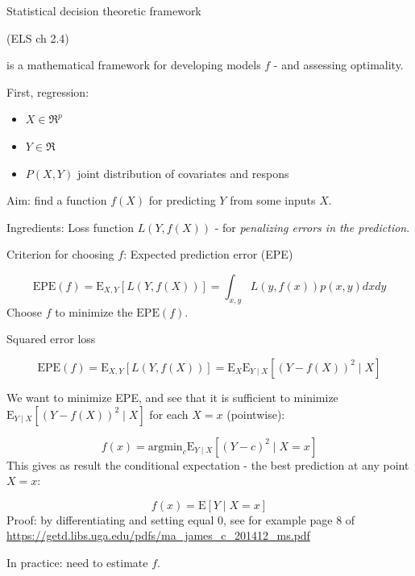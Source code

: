 \documentclass[
  ignorenonframetext,
]{beamer}
\providecommand{\tightlist}{%
  \setlength{\itemsep}{0pt}\setlength{\parskip}{0pt}}
\begin{document}
\begin{frame}{Statistical decision theoretic framework}
\protect\hypertarget{statistical-decision-theoretic-framework}{}

(ELS ch 2.4)

is a mathematical framework for developing models \(f\) - and assessing
optimality.

First, regression:

\begin{itemize}
\tightlist
\item
  \(X \in \Re^p\)
\item
  \(Y \in \Re\)
\item
  \(P(X,Y)\) joint distribution of covariates and respons
\end{itemize}

Aim: find a function \(f(X)\) for predicting \(Y\) from some inputs
\(X\).

Ingredients: Loss function \(L(Y,f(X))\) - for \emph{penalizing errors
in the prediction}.

Criterion for choosing \(f\): Expected prediction error (EPE)

\end{frame}

\begin{frame}

\[ \text{EPE}(f)=\text{E}_{X,Y}[L(Y,f(X))]=\int_{x,y}L(y,f(x))p(x,y)dxdy\]
Choose \(f\) to minimize the \(\text{EPE}(f)\).

\end{frame}

\begin{frame}

\begin{block}{Squared error loss}

\[ \text{EPE}(f)=\text{E}_{X,Y}[L(Y,f(X))]=\text{E}_{X}\text{E}_{Y \mid X}[(Y-f(X))^2\mid X]\]

We want to minimize EPE, and see that it is sufficient to minimize
\(\text{E}_{Y\mid X}[(Y-f(X))^2\mid X]\) for each \(X=x\) (pointwise):

\[ f(x)=\text{argmin}_c \text{E}_{Y \mid X}[(Y-c)^2 \mid X=x]\] This
gives as result the conditional expectation - the best prediction at any
point \(X=x\):

\[ f(x)=\text{E}[Y \mid X=x]\] Proof: by differentiating and setting
equal 0, see for example page 8 of
\url{https://getd.libs.uga.edu/pdfs/ma_james_c_201412_ms.pdf}

In practice: need to estimate \(f\).

\end{block}

\end{frame}
\end{document}
